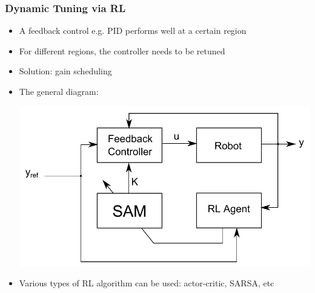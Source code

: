 \documentclass{beamer}
\begin{document}
			\begin{frame}\frametitle{Dynamic Tuning via RL}
				\vspace{3mm}
				\fontsize{9}{4}\selectfont 
				\begin{itemize}
					\item A feedback control e.g. PID performs well at a certain region
					\item For different regions, the controller needs to be retuned
					\item Solution: gain scheduling
					\pause
					\item The general diagram:
				\begin{center}
					\includegraphics[width=0.70\linewidth]{images/dynatuning_block}
					\hspace{5mm}
				\end{center}
				
				\item Various types of RL algorithm can be used: actor-critic, SARSA, etc
				\end{itemize}
			\end{frame}
			
\end{document}
